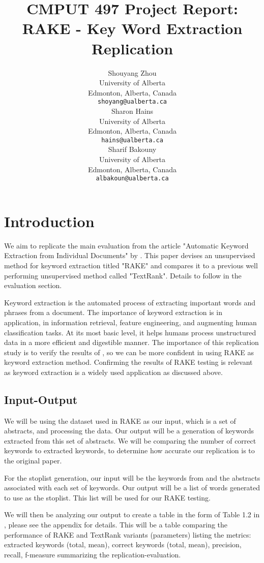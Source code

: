 \documentclass[11pt,a4paper]{article}
\title{CMPUT 497 Project Report: \\ RAKE - Key Word Extraction Replication}
\author{Shouyang Zhou \\
  University of Alberta \\
  Edmonton, Alberta, Canada \\
  {\tt shoyang@ualberta.ca} \\\And
  Sharon Hains \\
  University of Alberta \\
  Edmonton, Alberta, Canada \\
  {\tt hains@ualberta.ca} \\\And
  Sharif Bakouny \\
  University of Alberta \\
  Edmonton, Alberta, Canada \\
  {\tt albakoun@ualberta.ca} \\}
\date{}
\begin{document}
\maketitle

\section{Introduction}

We aim to replicate the main evaluation from the article "Automatic Keyword Extraction from Individual Documents" by \citet{1}. This paper devises an unsupervised method for keyword extraction titled "RAKE" and compares it to a previous well performing unsupervised method called "TextRank". Details to follow in the evaluation section.

Keyword extraction is the automated process of extracting important words and phrases from a document. The importance of keyword extraction is in application, in information retrieval, feature engineering, and augmenting human classification tasks. At its most basic level, it helps humans process unstructured data in a more efficient and digestible manner. The importance of this replication study is to verify the results of \citet{1}, so we can be more confident in using RAKE as keyword extraction method. Confirming the results of RAKE testing is relevant as keyword extraction is a widely used application as discussed above. 

\subsection{Input-Output}
We will be using the dataset used in RAKE as our input, which is a set of abstracts, and processing the data. Our output will be a generation of keywords extracted from this set of abstracts. We will be comparing the number of correct keywords to extracted keywords, to determine how accurate our replication is to the original paper.

For the stoplist generation, our input will be the keywords from \citep{hulth-2003-improved} and the abstracts associated with each set of keywords. Our output will be a list of words generated to use as the stoplist. This list will be used for our RAKE testing. 

We will then be analyzing our output to create a table in the form of Table 1.2 in \citet{1}, please see the appendix for details. This will be a table comparing the performance of RAKE and TextRank variants (parameters) listing the metrics: extracted keywords (total, mean), correct keywords (total, mean), precision, recall, f-measure summarizing the replication-evaluation. 
\end{document}
